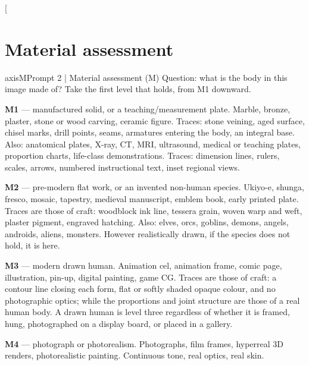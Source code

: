 \clearpage
\twocolumn[{\begin{minipage}{\textwidth}
\section{Material assessment}
\label{app:axisprompts}
\begin{promptcard}{axisM}{Prompt 2 | Material assessment (M)}
Question: what is the body in this image made of? Take the first level that
holds, from M1 downward.

\textbf{M1} --- manufactured solid, or a teaching/measurement plate. Marble, bronze,
plaster, stone or wood carving, ceramic figure. Traces: stone veining, aged
surface, chisel marks, drill points, seams, armatures entering the body, an
integral base. Also: anatomical plates, X-ray, CT, MRI, ultrasound, medical or
teaching plates, proportion charts, life-class demonstrations. Traces:
dimension lines, rulers, scales, arrows, numbered instructional text, inset
regional views.

\textbf{M2} --- pre-modern flat work, or an invented non-human species. Ukiyo-e,
shunga, fresco, mosaic, tapestry, medieval manuscript, emblem book, early
printed plate. Traces are those of craft: woodblock ink line, tessera grain,
woven warp and weft, plaster pigment, engraved hatching. Also: elves, orcs,
goblins, demons, angels, androids, aliens, monsters. However realistically
drawn, if the species does not hold, it is here.

\textbf{M3} --- modern drawn human. Animation cel, animation frame, comic page,
illustration, pin-up, digital painting, game CG. Traces are those of craft: a
contour line closing each form, flat or softly shaded opaque colour, and no
photographic optics; while the proportions and joint structure are those of a
real human body. A drawn human is level three regardless of whether it is
framed, hung, photographed on a display board, or placed in a gallery.

\textbf{M4} --- photograph or photorealism. Photographs, film frames, hyperreal 3D
renders, photorealistic painting. Continuous tone, real optics, real skin.


\end{promptcard}
\end{minipage}}
